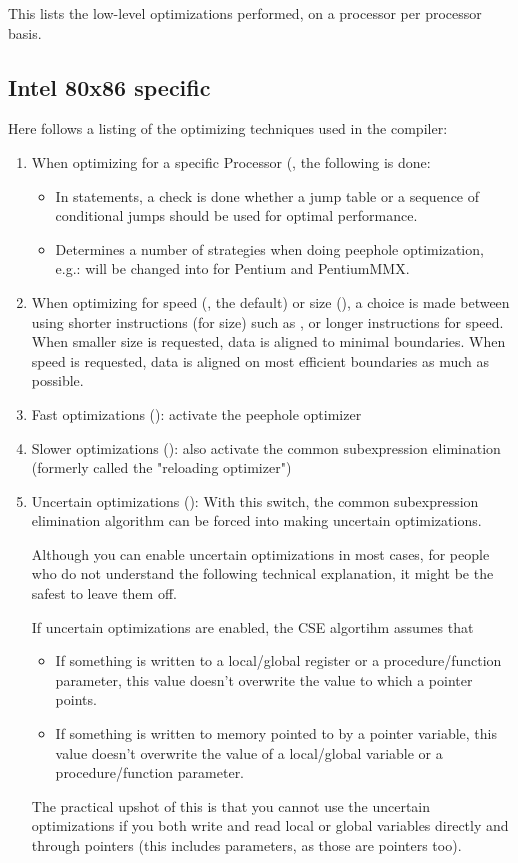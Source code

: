 This lists the low-level optimizations performed, on a processor
per processor basis.

\subsection{Intel 80x86 specific}

Here follows a listing of the optimizing techniques used in the compiler:
\begin{enumerate}
\item When optimizing for a specific Processor (,
the following is done:
\begin{itemize}
\item In  statements, a check is done whether a jump table
or a sequence of conditional jumps should be used for optimal performance.
\item Determines a number of strategies when doing peephole optimization, e.g.:
 will be changed into
 for Pentium and PentiumMMX.
\end{itemize}
\item When optimizing for speed (, the default) or size (), a choice is
made between using shorter instructions (for size) such as ,
or longer instructions  for speed. When smaller size is
requested, data is aligned to minimal boundaries.  When speed is
requested, data is aligned on most efficient boundaries as much as possible.
\item Fast optimizations (): activate the peephole optimizer
\item Slower optimizations (): also activate the common subexpression
elimination (formerly called the "reloading optimizer")
\item Uncertain optimizations (): With this switch, the common subexpression
elimination algorithm can be forced into making uncertain optimizations.

Although you can enable uncertain optimizations in most cases, for people who
do not understand the following technical explanation, it might be the safest to
leave them off.

\begin{remark}If uncertain optimizations are enabled, the CSE algortihm assumes
that
\begin{itemize}
\item If something is written to a local/global register or a
procedure/function parameter, this value doesn't overwrite the value to
which a pointer points.
\item If something is written to memory pointed to by a pointer variable,
this value doesn't overwrite the value of a local/global variable or a
procedure/function parameter.
\end{itemize}
\end{remark}
The practical upshot of this is that you cannot use the uncertain
optimizations if you both write and read local or global variables directly and
through pointers (this includes  parameters, as those are pointers too).


\end{enumerate}
